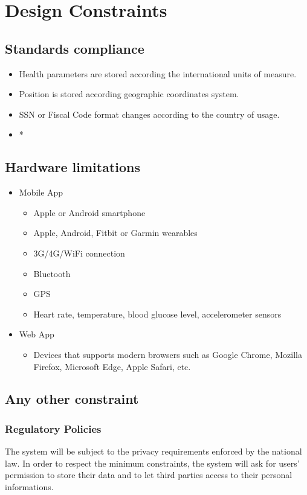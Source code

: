 \section{Design Constraints}
\subsection{Standards compliance}
    \begin{itemize}
        \item Health parameters are stored according the international units of measure.
        \item Position is stored according geographic coordinates system.
        \item SSN or Fiscal Code format changes according to the country of usage.
        \item *
    \end{itemize}

\subsection{Hardware limitations}
\begin{itemize}
\item Mobile App
    \begin{itemize}
        \item Apple or Android smartphone
        \item Apple, Android, Fitbit or Garmin wearables
        \item 3G/4G/WiFi connection
        \item Bluetooth
        \item GPS
        \item Heart rate, temperature, blood glucose level, accelerometer sensors
    \end{itemize}
\item Web App
    \begin{itemize}
        \item Devices that supports modern browsers such as Google Chrome, Mozilla Firefox, Microsoft Edge, Apple Safari, etc.
    \end{itemize}
\end{itemize}
\subsection{Any other constraint}

\subsubsection{Regulatory Policies}
The system will be subject to the privacy requirements enforced by the national law. In order to respect the minimum constraints, the system will ask for users' permission to store their data and to let third parties access to their personal informations.

